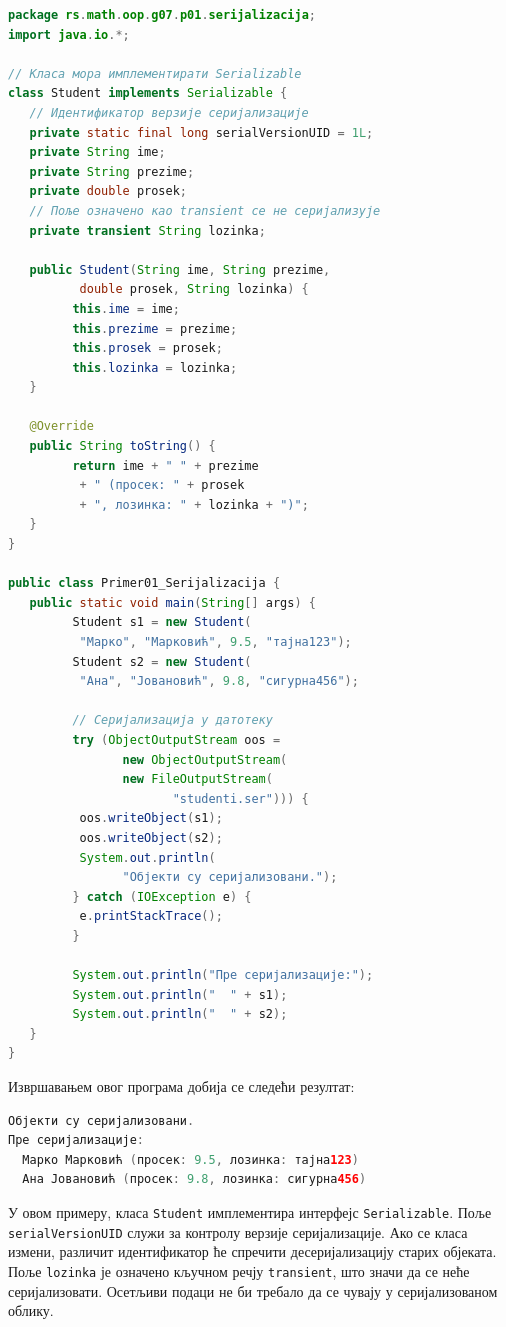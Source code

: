 \begin{lstlisting}[language=Java]
package rs.math.oop.g07.p01.serijalizacija;
import java.io.*;
 
// Класа мора имплементирати Serializable
class Student implements Serializable {
   // Идентификатор верзије серијализације
   private static final long serialVersionUID = 1L;
   private String ime;
   private String prezime;
   private double prosek;
   // Поље означено као transient се не серијализује
   private transient String lozinka;
 
   public Student(String ime, String prezime,
          double prosek, String lozinka) {
         this.ime = ime;
         this.prezime = prezime;
         this.prosek = prosek;
         this.lozinka = lozinka;
   }
 
   @Override
   public String toString() {
         return ime + " " + prezime
          + " (просек: " + prosek
          + ", лозинка: " + lozinka + ")";
   }
}
 
public class Primer01_Serijalizacija {
   public static void main(String[] args) {
         Student s1 = new Student(
          "Марко", "Марковић", 9.5, "тајна123");
         Student s2 = new Student(
          "Ана", "Јовановић", 9.8, "сигурна456");
 
         // Серијализација у датотеку
         try (ObjectOutputStream oos =
                new ObjectOutputStream(
                new FileOutputStream(
                       "studenti.ser"))) {
          oos.writeObject(s1);
          oos.writeObject(s2);
          System.out.println(
                "Објекти су серијализовани.");
         } catch (IOException e) {
          e.printStackTrace();
         }
 
         System.out.println("Пре серијализације:");
         System.out.println("  " + s1);
         System.out.println("  " + s2);
   }
}
\end{lstlisting}


Извршавањем овог програма добија се следећи резултат:


\begin{lstlisting}[language=Java]
Објекти су серијализовани.
Пре серијализације:
  Марко Марковић (просек: 9.5, лозинка: тајна123)
  Ана Јовановић (просек: 9.8, лозинка: сигурна456)
\end{lstlisting}


У овом примеру, класа \texttt{Student} имплементира интерфејс \texttt{Serializable}. Поље \texttt{serialVersionUID} служи за контролу верзије серијализације. Ако се класа измени, различит идентификатор ће спречити десеријализацију старих објеката. Поље \texttt{lozinka} је означено кључном речју \texttt{transient}, што значи да се неће серијализовати. Осетљиви подаци не би требало да се чувају у серијализованом облику.



